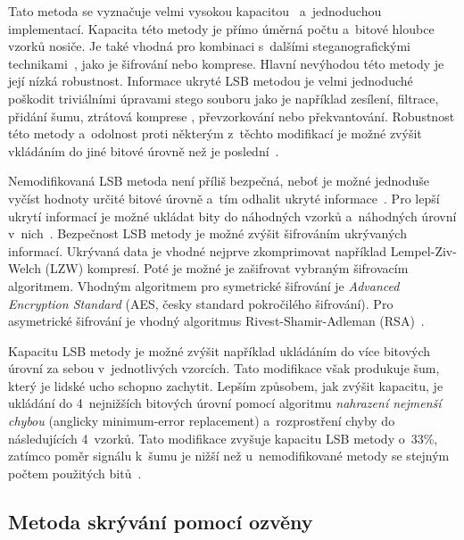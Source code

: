 Tato metoda se vyznačuje velmi vysokou kapacitou~\cite{Djebbar2012}
a~jednoduchou implementací. Kapacita této metody je přímo úměrná počtu a~bitové
hloubce vzorků nosiče. Je také vhodná pro kombinaci s~dalšími steganografickými
technikami~\cite{Djebbar2012}, jako je šifrování nebo komprese. Hlavní
nevýhodou této metody je její nízká robustnost. Informace ukryté LSB metodou je
velmi jednoduché poškodit triviálními úpravami stego souboru jako je například
zesílení, filtrace, přidání šumu, ztrátová komprese \cite{Djebbar2012},
převzorkování nebo překvantování. Robustnost této metody a~odolnost proti
některým z~těchto modifikací je možné zvýšit vkládáním do jiné bitové úrovně
než je poslední~\cite{Djebbar2012}.

Nemodifikovaná LSB metoda není příliš bezpečná, neboť je možné jednoduše vyčíst
hodnoty určité bitové úrovně a~tím odhalit ukryté informace~\cite{Djebbar2012}.
Pro lepší ukrytí informací je možné ukládat bity do náhodných vzorků
a~náhodných úrovní v~nich~\cite{Dutta2020}. Bezpečnost LSB metody je možné
zvýšit šifrováním ukrývaných informací. Ukrývaná data je vhodné nejprve
zkomprimovat například Lempel-Ziv-Welch (LZW) kompresí. Poté je možné je
zašifrovat vybraným šifrovacím algoritmem. Vhodným algoritmem pro symetrické
šifrování je \textit{Advanced Encryption Standard} (AES, česky standard
pokročilého šifrování). Pro asymetrické šifrování je vhodný algoritmus
Rivest-Shamir-Adleman (RSA)~\cite{Dutta2020}.

Kapacitu LSB metody je možné zvýšit například ukládáním do více bitových úrovní
za sebou v~jednotlivých vzorcích. Tato modifikace však produkuje šum, který je
lidské ucho schopno zachytit. Lepším způsobem, jak zvýšit kapacitu, je ukládání
do 4~nejnižších bitových úrovní pomocí algoritmu \textit{nahrazení nejmenší
chybou} (anglicky minimum-error replacement) a~rozprostření chyby do
následujících 4~vzorků. Tato modifikace zvyšuje kapacitu LSB metody o~33\%,
zatímco poměr signálu k~šumu je nižší než u~nemodifikované metody se stejným
počtem použitých bitů~\cite{Cvejic2002}.

\subsection*{Metoda skrývání pomocí ozvěny}
\label{sub:echo-hiding}

